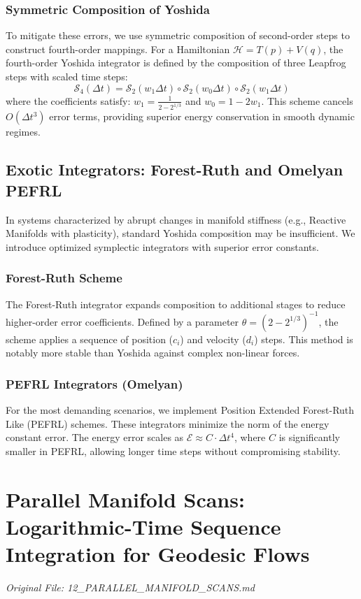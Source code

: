 \documentclass[11pt,a4paper]{report}
\begin{document}
\subsection{Symmetric Composition of Yoshida}
To mitigate these errors, we use symmetric composition of second-order steps to construct fourth-order mappings. For a Hamiltonian $\mathcal{H} = T(p) + V(q)$, the fourth-order Yoshida integrator is defined by the composition of three Leapfrog steps with scaled time steps:
\begin{equation}
    \mathcal{S}_4(\Delta t) = \mathcal{S}_2(w_1 \Delta t) \circ \mathcal{S}_2(w_0 \Delta t) \circ \mathcal{S}_2(w_1 \Delta t)
\end{equation}
where the coefficients satisfy: $w_1 = \frac{1}{2 - 2^{1/3}}$ and $w_0 = 1 - 2w_1$.
This scheme cancels $O(\Delta t^3)$ error terms, providing superior energy conservation in smooth dynamic regimes.

\section{Exotic Integrators: Forest-Ruth and Omelyan PEFRL}
In systems characterized by abrupt changes in manifold stiffness (e.g., Reactive Manifolds with plasticity), standard Yoshida composition may be insufficient. We introduce optimized symplectic integrators with superior error constants.

\subsection{Forest-Ruth Scheme}
The Forest-Ruth integrator expands composition to additional stages to reduce higher-order error coefficients. Defined by a parameter $\theta = (2 - 2^{1/3})^{-1}$, the scheme applies a sequence of position ($c_i$) and velocity ($d_i$) steps. This method is notably more stable than Yoshida against complex non-linear forces.

\subsection{PEFRL Integrators (Omelyan)}
For the most demanding scenarios, we implement Position Extended Forest-Ruth Like (PEFRL) schemes. These integrators minimize the norm of the energy constant error. The energy error scales as $\mathcal{E} \approx C \cdot \Delta t^4$, where $C$ is significantly smaller in PEFRL, allowing longer time steps without compromising stability.

\chapter{Parallel Manifold Scans: Logarithmic-Time Sequence Integration for Geodesic Flows}
\textit{Original File: 12\_PARALLEL\_MANIFOLD\_SCANS.md}
\end{document}
